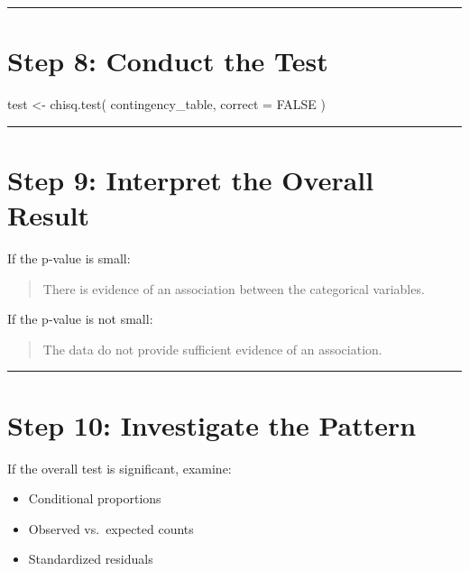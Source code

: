 \documentclass[
  letterpaper,
  DIV=11,
  numbers=noendperiod]{scrreprt}
\newenvironment{Shaded}{\begin{snugshade}}{\end{snugshade}}
\newcommand{\AttributeTok}[1]{\textcolor[rgb]{0.40,0.45,0.13}{#1}}
\newcommand{\ConstantTok}[1]{\textcolor[rgb]{0.56,0.35,0.01}{#1}}
\newcommand{\FunctionTok}[1]{\textcolor[rgb]{0.28,0.35,0.67}{#1}}
\newcommand{\NormalTok}[1]{\textcolor[rgb]{0.00,0.23,0.31}{#1}}
\newcommand{\OtherTok}[1]{\textcolor[rgb]{0.00,0.23,0.31}{#1}}
\providecommand{\tightlist}{%
  \setlength{\itemsep}{0pt}\setlength{\parskip}{0pt}}
\begin{document}
\begin{center}\rule{0.5\linewidth}{0.5pt}\end{center}

\section{Step 8: Conduct the Test}\label{step-8-conduct-the-test}

\begin{Shaded}
\begin{Highlighting}[]
\NormalTok{test }\OtherTok{\textless{}{-}} \FunctionTok{chisq.test}\NormalTok{(}
\NormalTok{    contingency\_table,}
    \AttributeTok{correct =} \ConstantTok{FALSE}
\NormalTok{)}
\end{Highlighting}
\end{Shaded}

\begin{center}\rule{0.5\linewidth}{0.5pt}\end{center}

\section{Step 9: Interpret the Overall
Result}\label{step-9-interpret-the-overall-result}

If the p-value is small:

\begin{quote}
There is evidence of an association between the categorical variables.
\end{quote}

If the p-value is not small:

\begin{quote}
The data do not provide sufficient evidence of an association.
\end{quote}

\begin{center}\rule{0.5\linewidth}{0.5pt}\end{center}

\section{Step 10: Investigate the
Pattern}\label{step-10-investigate-the-pattern}

If the overall test is significant, examine:

\begin{itemize}
\tightlist
\item
  Conditional proportions
\item
  Observed vs.~expected counts
\item
  Standardized residuals
\end{itemize}
\end{document}
